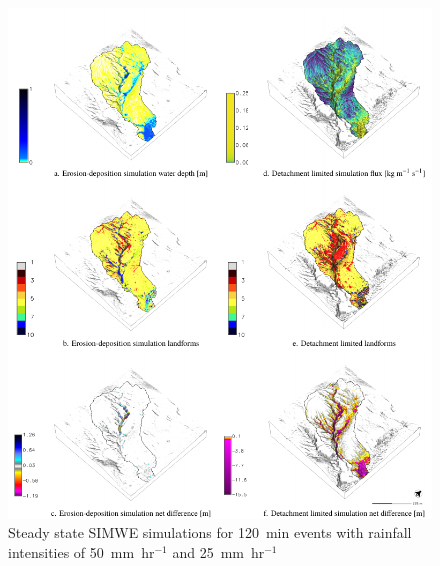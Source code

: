 \documentclass[gmd, manuscript]{copernicus}
\begin{document}
\begin{figure}%
\center
\includegraphics[width=\textwidth,height=0.95\textheight,keepaspectratio]{figures/simwe.pdf}
\caption{Steady state SIMWE simulations
for 120~\unit{min} events with rainfall intensities of 50~\unit{mm~hr}$^{-1}$
and 25~\unit{mm~hr}$^{-1}$}
\label{fig:simwe_simulations}
\end{figure}

\conclusions
\end{document}
